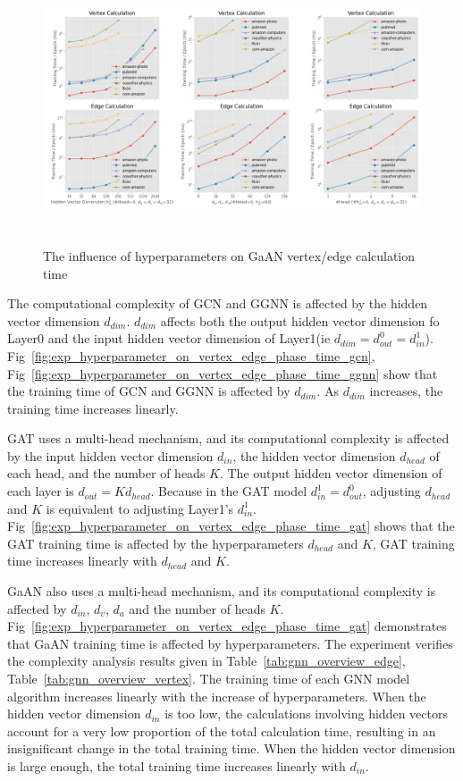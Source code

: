 \begin{figure}
	\centering
    \includegraphics[height=8cm]{figs/experiments/exp_hyperparameter_on_vertex_edge_phase_time_gaan.png}
    \caption{The influence of hyperparameters on GaAN vertex/edge calculation time}
	\label{fig:exp_hyperparameter_on_vertex_edge_phase_time_gaan}
\end{figure}

The computational complexity of GCN and GGNN is affected by the hidden vector dimension $d_{dim}$. $d_{dim}$ affects both the output hidden vector dimension fo Layer0 and
the input hidden vector dimension of Layer1(ie $d_{dim} = d^0_{out} = d^1_{in}$). Fig~\ref{fig:exp_hyperparameter_on_vertex_edge_phase_time_gcn}, Fig~\ref{fig:exp_hyperparameter_on_vertex_edge_phase_time_ggnn}
show that the training time of GCN and GGNN is affected by $d_{dim}$. As $d_{dim}$ increases, the training time increases linearly.

GAT uses a multi-head mechanism, and its computational complexity is affected by the input hidden vector dimension $d_{in}$, the hidden vector dimension $d_{head}$ of each head, and the number of heads $K$.
The output hidden vector dimension of each layer is $d_{out}=K d_{head}$.
Because in the GAT model $d^1_{in}=d^0_{out}$, adjusting $d_{head}$ and $K$ is equivalent to adjusting Layer1’s $d^1_{in}$.
Fig~\ref{fig:exp_hyperparameter_on_vertex_edge_phase_time_gat} shows that the GAT training time is affected by the hyperparameters $d_{head}$ and $K$, 
GAT training time increases linearly with $d_{head}$ and $K$.


GaAN also uses a multi-head mechanism, and its computational complexity is affected by $d_{in}$, $d_v$, $d_a$ and the number of heads $K$.
Fig~\ref{fig:exp_hyperparameter_on_vertex_edge_phase_time_gat} demonstrates that GaAN training time is affected by hyperparameters.
The experiment verifies the complexity analysis results given in Table~\ref{tab:gnn_overview_edge}, Table~\ref{tab:gnn_overview_vertex}. The training time of each GNN model algorithm increases linearly with the increase of hyperparameters.
When the hidden vector dimension $d_{in}$ is too low, the calculations involving hidden vectors account for a very low proportion of the total calculation time, resulting in an insignificant change in the total training time.
When the hidden vector dimension is large enough, the total training time increases linearly with $d_{in}$.


